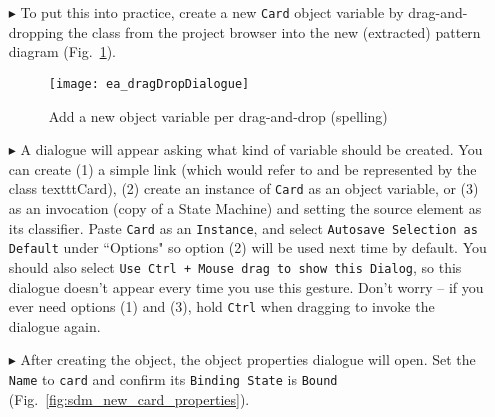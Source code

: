 \begin{itemize}
The main advantage of drag-and-drop is that the \texttt{Object Variable Pro\-per\-ties} dialogue will have the type of the object pre-configured. Choosing
the type in the project browser and dragging it in is (for some people) a more natural gesture than choosing the type from a long drop-down menu (as we had to
when using the SDM toolbar). This can be a great time saver for large metamodels.\footnote{Drag-and-drop is also possible in embedded story patterns
(those still visualised in their story nodes).  You must ensure however, that the object variable is \emph{completely} contained inside the story node, and does
not stick out over any edge.}

\vspace{0.5cm}

\item[$\blacktriangleright$] To put this into practice, create a new \texttt{Card} object variable by drag-and-dropping the class from the project browser
into the new (extracted) pattern diagram (Fig.~\ref{fig:sdm_check_bound_card}).

\vspace{0.5cm}

\begin{figure}[htbp]
\begin{center}
  \texttt{[image: ea\_dragDropDialogue]}
  \caption{Add a new object variable per drag-and-drop \update(spelling)}
  \label{fig:sdm_check_bound_card}
\end{center}
\end{figure}

\item[$\blacktriangleright$] A dialogue will appear asking what kind of variable should be created. You can create (1) a simple link (which would refer to and
be represented by the class texttt{Card}), (2) create an instance of \texttt{Card} as an object variable, or (3) as an invocation (copy of a State Machine) and
setting the source element as its classifier. Paste \texttt{Card} as an \texttt{Instance}, and select \texttt{Autosave Selection as Default} under ``Options" so
option (2) will be used next time by default. You should also select \texttt{Use Ctrl + Mouse drag to show this Dialog}, so this dialogue doesn't appear every
time you use this gesture. Don't worry -- if you ever need options (1) and (3), hold \texttt{Ctrl} when dragging to invoke the dialogue again.

\vspace{0.5cm}

\item[$\blacktriangleright$] After creating the object, the object properties dialogue will open.  Set the \texttt{Name} to \texttt{card} and confirm its
\texttt{Binding State} is \texttt{Bound} (Fig.~\ref{fig:sdm_new_card_properties}).


\end{itemize}

